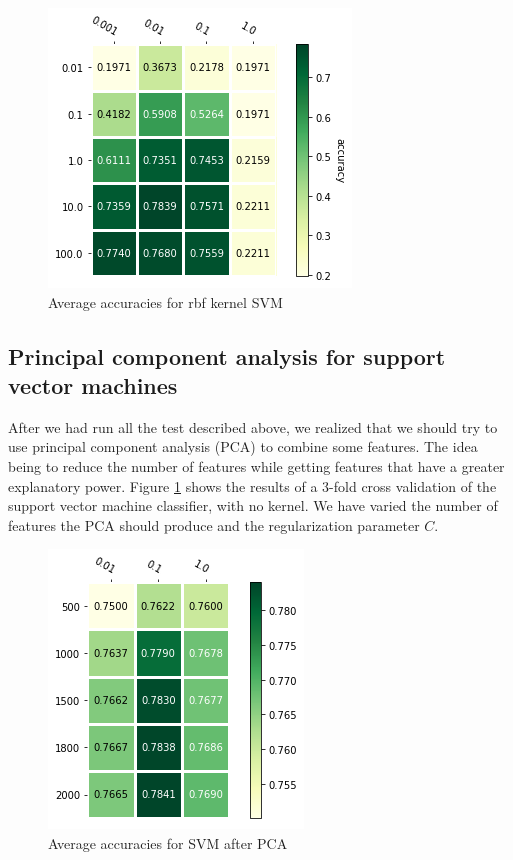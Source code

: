 \documentclass[parskip=half]{scrartcl}
\theoremstyle{definition}
\theoremstyle{remark}
\begin{document}
\begin{figure}[H]
\caption{Average accuracies for rbf kernel SVM} \label{fig:pca_svm}
\centering
\includegraphics[scale=0.6]{images/svm_rbf.png}
\end{figure}

\subsection{Principal component analysis for support vector machines}

After we had run all the test described above, we realized that we should try to use principal component analysis (PCA) to combine some features. 
The idea being to reduce the number of features while getting features that have a greater explanatory power. 
Figure \ref{fig:pca_svm} shows the results of a 3-fold cross validation of the support vector machine classifier, with no kernel. 
We have varied the number of features the PCA should produce and the regularization parameter $C$. 

\begin{figure}[H]
\caption{Average accuracies for SVM after PCA} \label{fig:rbfsvm}
\centering
\includegraphics[scale=0.6]{images/pca_svm.png}
\end{figure}
\end{document}
